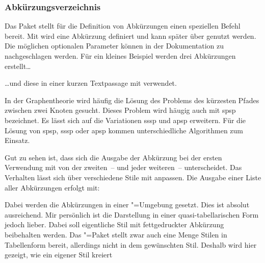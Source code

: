 \documentclass[%
  english,ngerman,%
  geometry=no,DIV=12,automark,%
]{tudscrartcl}
\begin{document}
\subsubsection{Abkürzungsverzeichnis}
Das Paket  stellt für die Definition von Abkürzungen einen 
speziellen Befehl bereit. Mit\LParameter{}%
 wird eine Abkürzung definiert und 
kann später über  genutzt werden. Die möglichen optionalen 
Parameter können in der Dokumentation zu  nachgeschlagen 
werden. Für ein kleines Beispiel werden drei Abkürzungen erstellt\dots
%
\begin{Tutorial}
\end{Tutorial}
%
\dots und diese in einer kurzen Textpassage mit  
verwendet.
%
\begin{Tutorial}
In der Graphentheorie wird häufig die Lösung des Problems des kürzesten
Pfades zwischen zwei Knoten gesucht. Dieses Problem wird häugig auch
mit \gls{spsp} bezeichnet. Es lässt sich auf die Variationen \gls{sssp}
und \gls{apsp} erweitern. Für die Lösung von \gls{spsp}, \gls{sssp} oder 
\gls{apsp} kommen unterschiedliche Algorithmen zum Einsatz.
\end{Tutorial}
%
Gut zu sehen ist, dass sich die Ausgabe der Abkürzung bei der ersten Verwendung 
mit  von der zweiten~-- und jeder weiteren~-- unterscheidet. Das 
Verhalten lässt sich über verschiedene Stile mit  
anpassen. Die Ausgabe einer Liste aller Abkürzungen erfolgt mit:
%
\begin{Tutorial-}
\printacronyms
\end{Tutorial-}
\begin{quoting}[rightmargin=0pt]
\vspace*{-\baselineskip}
\glsdisablehyper
\printacronyms
\end{quoting}
%
Dabei werden die Abkürzungen in einer "=Umgebung 
gesetzt. Dies ist absolut ausreichend. Mir persönlich ist die Darstellung in 
einer quasi-tabellarischen Form jedoch lieber. Dabei soll eigentliche Stil mit 
fettgedruckter Abkürzung beibehalten werden. Das "=Paket 
stellt zwar auch eine Menge Stilen in Tabellenform bereit, allerdings nicht in 
dem gewünschten Stil. Deshalb wird hier gezeigt, wie ein eigener Stil kreiert 
\end{document}
